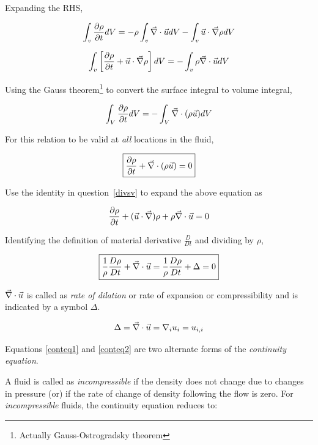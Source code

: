 Expanding the RHS,

$$ \int_{v}{{\partial \rho \over \partial t} dV} = - \rho \int_{v}{\vec{\nabla} \cdot \vec{u} dV} - \int_{v}{ \vec{u} \cdot \vec{\nabla} \rho dV} $$

$$ \int_{v}{\left[{\partial \rho \over \partial t} + \vec{u} \cdot \vec{\nabla} \rho\right] dV} = - \int_{v}{ \rho \vec{\nabla} \cdot \vec{u} dV} $$


Using the Gauss theorem\footnote{Actually Gauss-Ostrogradsky theorem} to convert the surface integral to volume integral,

\begin{equation}
\int_{V}{\frac{\partial \rho}{\partial t} dV} = -\int_{V}{\vec{\nabla}\cdot(\rho\vec{u})dV}
\end{equation} 

For this relation to be valid at {\em all} locations in the fluid,


\begin{equation}
\label{conteq1}
\boxed{\frac{\partial \rho}{\partial t} +  \vec{\nabla}\cdot(\rho\vec{u}) = 0}
\end{equation}


Use the identity in question~\ref{divsv} to expand the above equation as

\begin{equation}
\frac{\partial \rho}{\partial t} + (\vec{u}\cdot\vec{\nabla})\rho + \rho\vec{\nabla}\cdot\vec{u}  = 0
\end{equation} 

Identifying the definition of material derivative $\frac{D}{Dt}$ and dividing by $\rho$,

\begin{equation}
\label{conteq2}
\boxed{\frac{1}{\rho}\frac{D \rho}{D t} + \vec{\nabla}\cdot\vec{u}  = \frac{1}{\rho}\frac{D \rho}{D t} + \Delta = 0}
\end{equation} 

$\vec{\nabla}\cdot\vec{u}$ is called as {\em rate of dilation} or rate of expansion or compressibility and is indicated by a symbol $\Delta$.

\begin{equation}
\label{rdiln}
\Delta = \vec{\nabla}\cdot\vec{u}  = \nabla_i u_i = u_{i,i}
\end{equation} 

Equations \ref{conteq1} and \ref{conteq2} are two alternate forms of the {\em continuity equation}.

A fluid is called as {\em incompressible} if the density does not change due to changes in pressure (or) if the rate of change of density following the flow is zero. For {\em incompressible} fluids, the continuity equation reduces to:

